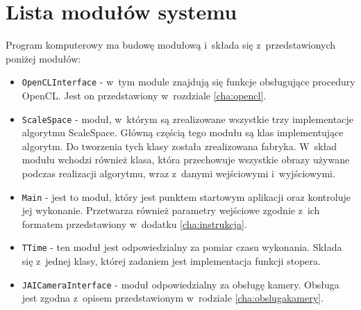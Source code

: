 \chapter{Lista modułów systemu}
\label{cha:dokumentacja}

Program komputerowy ma budowę modułową i~składa się z~przedstawionych poniżej modułów:
\begin{itemize}
\item \texttt{OpenCLInterface} - w~tym module znajdują się funkcje obsługujące procedury OpenCL. Jest on przedstawiony w~rozdziale \ref{cha:opencl}.
\item \texttt{ScaleSpace} - moduł, w~którym są zrealizowane wszystkie trzy implementacje algorytmu ScaleSpace. Główną częścią tego modułu są klas implementujące algorytm. Do tworzenia tych klasy została zrealizowana fabryka. W~skład modułu wchodzi również klasa, która przechowuje wszystkie obrazy używane podczas realizacji algorytmu, wraz z~danymi wejściowymi i~wyjściowymi.
\item \texttt{Main} - jest to moduł, który jest punktem startowym aplikacji oraz kontroluje jej wykonanie. Przetwarza również parametry wejściowe zgodnie z~ich formatem przedstawiony w~dodatku \ref{cha:instrukcja}.
\item \texttt{TTime} - ten moduł jest odpowiedzialny za pomiar czasu wykonania. Składa się z~jednej klasy, której zadaniem jest implementacja funkcji stopera.
\item \texttt{JAICameraInterface} - moduł odpowiedzialny za obsługę kamery. Obsługa jest zgodna z~opisem przedstawionym w~rodziale \ref{cha:obslugakamery}.
\end{itemize}
